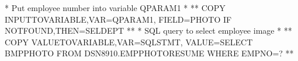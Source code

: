\documentclass[letterpaper,10pt,english]{sphinxmanual}
\begin{document}
\begin{sphinxVerbatim}[commandchars=\\\{\}]
* Put employee number into variable QPARAM1                           *
*\PYGZhy{}\PYGZhy{}\PYGZhy{}\PYGZhy{}\PYGZhy{}\PYGZhy{}\PYGZhy{}\PYGZhy{}\PYGZhy{}\PYGZhy{}\PYGZhy{}\PYGZhy{}\PYGZhy{}\PYGZhy{}\PYGZhy{}\PYGZhy{}\PYGZhy{}\PYGZhy{}\PYGZhy{}\PYGZhy{}\PYGZhy{}\PYGZhy{}\PYGZhy{}\PYGZhy{}\PYGZhy{}\PYGZhy{}\PYGZhy{}\PYGZhy{}\PYGZhy{}\PYGZhy{}\PYGZhy{}\PYGZhy{}\PYGZhy{}\PYGZhy{}\PYGZhy{}\PYGZhy{}\PYGZhy{}\PYGZhy{}\PYGZhy{}\PYGZhy{}\PYGZhy{}\PYGZhy{}\PYGZhy{}\PYGZhy{}\PYGZhy{}\PYGZhy{}\PYGZhy{}\PYGZhy{}\PYGZhy{}\PYGZhy{}\PYGZhy{}\PYGZhy{}\PYGZhy{}\PYGZhy{}\PYGZhy{}\PYGZhy{}\PYGZhy{}\PYGZhy{}\PYGZhy{}\PYGZhy{}\PYGZhy{}\PYGZhy{}\PYGZhy{}\PYGZhy{}\PYGZhy{}\PYGZhy{}\PYGZhy{}\PYGZhy{}\PYGZhy{}*
   COPY\PYGZdl{} INPUT\PYGZhy{}TO\PYGZhy{}VARIABLE,VAR=\PYGZsq{}QPARAM1\PYGZsq{},                        \PYGZhy{}
         FIELD=\PYGZsq{}PHOTO\PYGZsq{}
   IF\PYGZdl{}   NOT\PYGZhy{}FOUND,THEN=SELDEPT
*\PYGZhy{}\PYGZhy{}\PYGZhy{}\PYGZhy{}\PYGZhy{}\PYGZhy{}\PYGZhy{}\PYGZhy{}\PYGZhy{}\PYGZhy{}\PYGZhy{}\PYGZhy{}\PYGZhy{}\PYGZhy{}\PYGZhy{}\PYGZhy{}\PYGZhy{}\PYGZhy{}\PYGZhy{}\PYGZhy{}\PYGZhy{}\PYGZhy{}\PYGZhy{}\PYGZhy{}\PYGZhy{}\PYGZhy{}\PYGZhy{}\PYGZhy{}\PYGZhy{}\PYGZhy{}\PYGZhy{}\PYGZhy{}\PYGZhy{}\PYGZhy{}\PYGZhy{}\PYGZhy{}\PYGZhy{}\PYGZhy{}\PYGZhy{}\PYGZhy{}\PYGZhy{}\PYGZhy{}\PYGZhy{}\PYGZhy{}\PYGZhy{}\PYGZhy{}\PYGZhy{}\PYGZhy{}\PYGZhy{}\PYGZhy{}\PYGZhy{}\PYGZhy{}\PYGZhy{}\PYGZhy{}\PYGZhy{}\PYGZhy{}\PYGZhy{}\PYGZhy{}\PYGZhy{}\PYGZhy{}\PYGZhy{}\PYGZhy{}\PYGZhy{}\PYGZhy{}\PYGZhy{}\PYGZhy{}\PYGZhy{}\PYGZhy{}\PYGZhy{}*
* SQL query to select employee image                                  *
*\PYGZhy{}\PYGZhy{}\PYGZhy{}\PYGZhy{}\PYGZhy{}\PYGZhy{}\PYGZhy{}\PYGZhy{}\PYGZhy{}\PYGZhy{}\PYGZhy{}\PYGZhy{}\PYGZhy{}\PYGZhy{}\PYGZhy{}\PYGZhy{}\PYGZhy{}\PYGZhy{}\PYGZhy{}\PYGZhy{}\PYGZhy{}\PYGZhy{}\PYGZhy{}\PYGZhy{}\PYGZhy{}\PYGZhy{}\PYGZhy{}\PYGZhy{}\PYGZhy{}\PYGZhy{}\PYGZhy{}\PYGZhy{}\PYGZhy{}\PYGZhy{}\PYGZhy{}\PYGZhy{}\PYGZhy{}\PYGZhy{}\PYGZhy{}\PYGZhy{}\PYGZhy{}\PYGZhy{}\PYGZhy{}\PYGZhy{}\PYGZhy{}\PYGZhy{}\PYGZhy{}\PYGZhy{}\PYGZhy{}\PYGZhy{}\PYGZhy{}\PYGZhy{}\PYGZhy{}\PYGZhy{}\PYGZhy{}\PYGZhy{}\PYGZhy{}\PYGZhy{}\PYGZhy{}\PYGZhy{}\PYGZhy{}\PYGZhy{}\PYGZhy{}\PYGZhy{}\PYGZhy{}\PYGZhy{}\PYGZhy{}\PYGZhy{}\PYGZhy{}*
   COPY\PYGZdl{} VALUE\PYGZhy{}TO\PYGZhy{}VARIABLE,VAR=\PYGZsq{}SQLSTMT\PYGZsq{},                        \PYGZhy{}
         VALUE=\PYGZsq{}SELECT BMP\PYGZus{}PHOTO FROM DSN8910.EMP\PYGZus{}PHOTO\PYGZus{}RESUME   \PYGZhy{}
         WHERE EMPNO=?\PYGZsq{}
*\PYGZhy{}\PYGZhy{}\PYGZhy{}\PYGZhy{}\PYGZhy{}\PYGZhy{}\PYGZhy{}\PYGZhy{}\PYGZhy{}\PYGZhy{}\PYGZhy{}\PYGZhy{}\PYGZhy{}\PYGZhy{}\PYGZhy{}\PYGZhy{}\PYGZhy{}\PYGZhy{}\PYGZhy{}\PYGZhy{}\PYGZhy{}\PYGZhy{}\PYGZhy{}\PYGZhy{}\PYGZhy{}\PYGZhy{}\PYGZhy{}\PYGZhy{}\PYGZhy{}\PYGZhy{}\PYGZhy{}\PYGZhy{}\PYGZhy{}\PYGZhy{}\PYGZhy{}\PYGZhy{}\PYGZhy{}\PYGZhy{}\PYGZhy{}\PYGZhy{}\PYGZhy{}\PYGZhy{}\PYGZhy{}\PYGZhy{}\PYGZhy{}\PYGZhy{}\PYGZhy{}\PYGZhy{}\PYGZhy{}\PYGZhy{}\PYGZhy{}\PYGZhy{}\PYGZhy{}\PYGZhy{}\PYGZhy{}\PYGZhy{}\PYGZhy{}\PYGZhy{}\PYGZhy{}\PYGZhy{}\PYGZhy{}\PYGZhy{}\PYGZhy{}\PYGZhy{}\PYGZhy{}\PYGZhy{}\PYGZhy{}\PYGZhy{}\PYGZhy{}*

\end{sphinxVerbatim}
\end{document}
